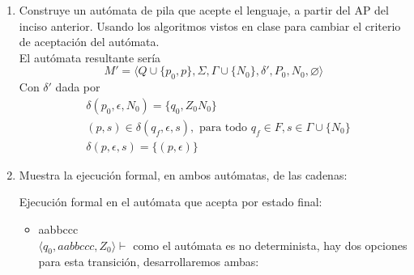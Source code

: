 \documentclass{article}
\begin{document}
\begin{enumerate}
{\begin{enumerate}
{	        \begin{itemize}
	        	\item {
	        		$Q = \{q_0\} \cup Q_1 \cup Q_2$
	        	}
	        	
	        	\item {
	        		$\Sigma = \{a, b, c\}$
	        	}
	        	\item {
	        		$\Gamma = \{A, B, Z_0\}$
	        	}
	        	\item {
	        		\begin{align*}
	        		&\delta (q_0, \epsilon, Z_0) = \{(q_1, Z_0),
	        		(q_6, Z_0)\}\\
	        		&\delta (p, s, \gamma) = \delta_1 (p, s, \gamma) \cup
	        		\delta_2 (p, s, \gamma) 		
	        		\end{align*}
	        		Donde $p$ es cualquier estado que no sea $q_0$, $s$ un símbolo de $\Sigma$	y $\gamma$ cualquier símbolo de $\Gamma$.
	        	}
	        	\item {
	        		$q_0$ es el estado inicial.
	        	}
	        	\item {
	        		$Z_0$ es el símbolo al fondo de la pila.
	        	}
	        	\item {
	        		$F = F_1 \cup F_2$
	        	}
	        \end{itemize}
	        }
        	\item{
            Construye un autómata de pila que acepte el lenguaje, a partir del
            AP del inciso anterior. Usando los algoritmos vistos en clase para
            cambiar el criterio de aceptación del autómata.\\
            El autómata resultante sería 
            \[M' = \langle Q \cup \{p_0, p\} , \Sigma, \Gamma \cup \{N_0\} , \delta', P_0 , N_0, \varnothing \rangle\]
            Con $\delta'$ dada por
            \begin{align*}
            	&\delta(p_0, \epsilon, N_0) = \{q_0, Z_0N_0\}\\
            	&(p,s) \in \delta(q_f, \epsilon, s), \text{ para todo } q_f \in F, s \in \Gamma \cup \{N_0\}\\
            	&\delta(p, \epsilon, s) = \{(p,\epsilon)\}
            \end{align*}
           }   	
        	\item{
        	Muestra la ejecución formal, en ambos autómatas, de las cadenas:
        	
        	Ejecución formal en el autómata que acepta por estado final:\\
        	\begin{itemize}
        		\item {
        		aabbccc\\
        		$\langle q_0, aabbccc, Z_0 \rangle \vdash$ como el autómata es no determinista, hay dos opciones para esta transición, desarrollaremos ambas:\\
        		
}
\end{itemize}}
\end{enumerate}}
\end{enumerate}
\end{document}
